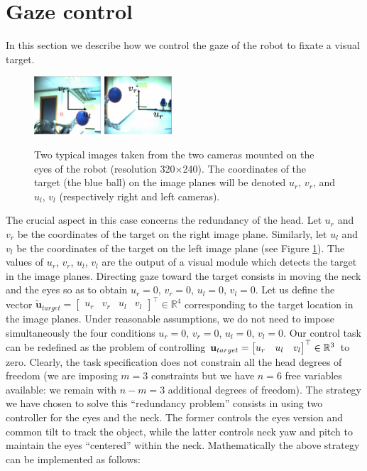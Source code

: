 \section{Gaze control}
\label{Sec:gazecontrol}

In this section we describe how we control the gaze of the robot to
fixate a visual target.
%
\begin{figure}[tbp]
\centering
\includegraphics[width=25mm]{Figure/LeftImage.eps} \hspace{1cm}
\includegraphics[width=25mm]{Figure/RightImage.eps}
\caption{Two typical images taken from the two cameras mounted on the 
eyes of the robot (resolution 320$\times$240). 
The coordinates of the target (the blue ball) on the image planes
will be denoted $u_r$, $v_r$, and $u_l$, $v_l$ (respectively right 
and left cameras).}
\label{Fig:ImagePlane}
\end{figure}
% 
The crucial aspect in this case concerns the redundancy of the 
head. Let $u_r$ and $v_r$ be the coordinates of the target on the 
right image plane. Similarly, let $u_l$ and $v_l$ be the coordinates 
of the target on the 
left image plane (see Figure \ref{Fig:ImagePlane}). The values of $u_r$, 
$v_r$, $u_l$, $v_l$ are the output of a visual module which detects the
target in the image planes. Directing gaze 
toward the target 
consists in moving the neck and the eyes so as to obtain 
$u_r=0$, $v_r=0$, $u_l=0$, $v_l=0$. 
Let us define the vector 
$\tilde {\mathbf u}_{target}= \begin{bmatrix} u_r & v_r & u_l & v_l 
\end{bmatrix}^\top \in \mathbb R^4$ corresponding to the 
target location in the image planes. Under reasonable 
assumptions, we do not need to impose simultaneously 
the four conditions $u_r=0$, $v_r=0$, $u_l=0$, $v_l=0$.  Our control task 
can be redefined as the problem of controlling 
$\mathbf{u}_{target} = \begin{bmatrix} u_r & u_l & v_l \end{bmatrix}^\top \in \mathbb R^3$ 
to zero. Clearly, the task specification does not constrain all the head degrees of 
freedom (we are imposing $m=3$ constraints but we have $n=6$ free variables 
available: we remain with $n-m=3$ additional degrees of freedom). 
The strategy we have chosen to solve this ``redundancy problem'' consists in 
using two controller for the eyes and the neck. The former controls 
the eyes version and common tilt to track the object, while the latter
controls neck yaw and pitch to maintain the eyes ``centered'' within 
the neck. Mathematically the above strategy can be implemented 
as follows:

